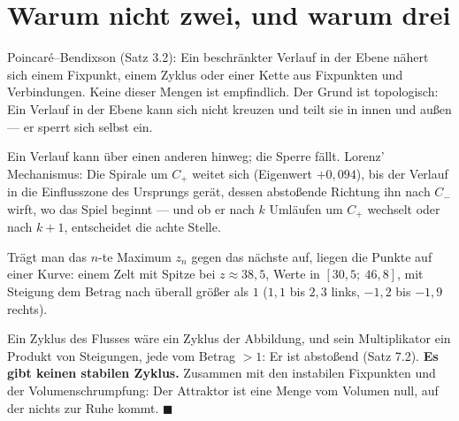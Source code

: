 \section{Warum nicht zwei, und warum drei}

\begin{merksatz}
Poincaré--Bendixson (Satz 3.2): Ein beschränkter Verlauf in der Ebene nähert sich einem Fixpunkt, einem Zyklus oder einer Kette aus Fixpunkten und Verbindungen. Keine dieser Mengen ist empfindlich. Der Grund ist topologisch: Ein Verlauf in der Ebene kann sich nicht kreuzen und teilt sie in innen und außen --- er sperrt sich selbst ein.

Ein Verlauf kann über einen anderen hinweg; die Sperre fällt. Lorenz' Mechanismus: Die Spirale um $C_+$ weitet sich (Eigenwert $+0{,}094$), bis der Verlauf in die Einflusszone des Ursprungs gerät, dessen abstoßende Richtung ihn nach $C_-$ wirft, wo das Spiel beginnt --- und ob er nach $k$ Umläufen um $C_+$ wechselt oder nach $k+1$, entscheidet die achte Stelle.

Trägt man das $n$-te Maximum $z_n$ gegen das nächste auf, liegen die Punkte auf einer Kurve: einem Zelt mit Spitze bei $z \approx 38{,}5$, Werte in $[30{,}5;\ 46{,}8]$, mit Steigung dem Betrag nach überall größer als $1$ ($1{,}1$ bis $2{,}3$ links, $-1{,}2$ bis $-1{,}9$ rechts).

Ein Zyklus des Flusses wäre ein Zyklus der Abbildung, und sein Multiplikator ein Produkt von Steigungen, jede vom Betrag $> 1$: Er ist abstoßend (Satz 7.2). \textbf{Es gibt keinen stabilen Zyklus.} Zusammen mit den instabilen Fixpunkten und der Volumenschrumpfung: Der Attraktor ist eine Menge vom Volumen null, auf der nichts zur Ruhe kommt. $\blacksquare$

\begin{center}
\begin{minipage}{0.88\textwidth}
\end{minipage}
\end{center}
\end{merksatz}

